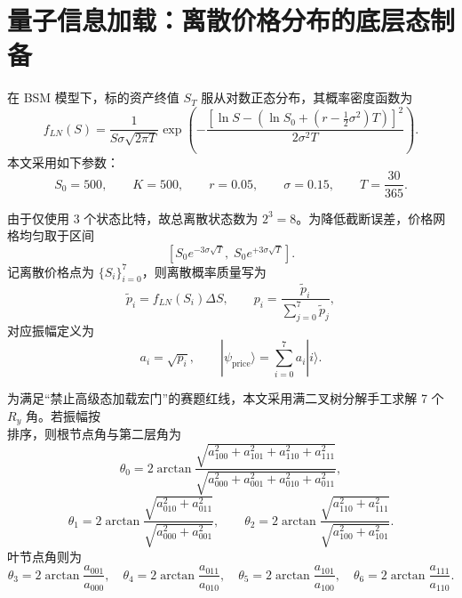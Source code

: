 \documentclass[12pt,a4paper]{ctexart}
\begin{document}
\section{量子信息加载：离散价格分布的底层态制备}
在 BSM 模型下，标的资产终值 $S_T$ 服从对数正态分布，其概率密度函数为
\begin{equation}
f_{LN}(S)=\frac{1}{S\sigma\sqrt{2\pi T}}
\exp\!\left(
-\frac{\left[\ln S-\left(\ln S_0+\left(r-\frac{1}{2}\sigma^2\right)T\right)\right]^2}{2\sigma^2T}
\right).
\end{equation}
本文采用如下参数：
\begin{equation}
S_0=500,\qquad K=500,\qquad r=0.05,\qquad \sigma=0.15,\qquad T=\frac{30}{365}.
\end{equation}

由于仅使用 3 个状态比特，故总离散状态数为 $2^3=8$。为降低截断误差，价格网格均匀取于区间
\begin{equation}
\left[S_0 e^{-3\sigma\sqrt{T}},\; S_0 e^{+3\sigma\sqrt{T}}\right].
\end{equation}
记离散价格点为 $\{S_i\}_{i=0}^{7}$，则离散概率质量写为
\begin{equation}
\tilde p_i=f_{LN}(S_i)\Delta S,\qquad
p_i=\frac{\tilde p_i}{\sum_{j=0}^{7}\tilde p_j},
\end{equation}
对应振幅定义为
\begin{equation}
a_i=\sqrt{p_i},\qquad
|\psi_{\mathrm{price}}\rangle=\sum_{i=0}^{7} a_i |i\rangle.
\end{equation}

为满足“禁止高级态加载宏门”的赛题红线，本文采用满二叉树分解手工求解 7 个 $R_y$ 角。若振幅按
\begin{equation}
[a_{000},a_{001},a_{010},a_{011},a_{100},a_{101},a_{110},a_{111}]
\end{equation}
排序，则根节点角与第二层角为
\begin{equation}
\theta_0=
2\arctan\frac{\sqrt{a_{100}^2+a_{101}^2+a_{110}^2+a_{111}^2}}
{\sqrt{a_{000}^2+a_{001}^2+a_{010}^2+a_{011}^2}},
\end{equation}
\begin{equation}
\theta_1=
2\arctan\frac{\sqrt{a_{010}^2+a_{011}^2}}{\sqrt{a_{000}^2+a_{001}^2}},
\qquad
\theta_2=
2\arctan\frac{\sqrt{a_{110}^2+a_{111}^2}}{\sqrt{a_{100}^2+a_{101}^2}}.
\end{equation}
叶节点角则为
\begin{equation}
\theta_3=2\arctan\frac{a_{001}}{a_{000}},\quad
\theta_4=2\arctan\frac{a_{011}}{a_{010}},\quad
\theta_5=2\arctan\frac{a_{101}}{a_{100}},\quad
\theta_6=2\arctan\frac{a_{111}}{a_{110}}.
\end{equation}
\end{document}
